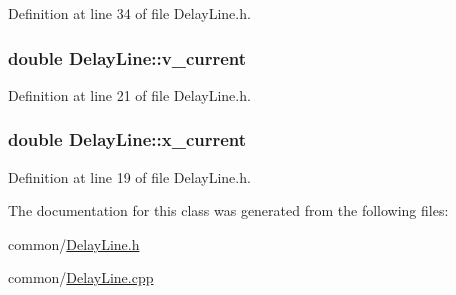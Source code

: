 Definition at line 34 of file DelayLine.h.

\hypertarget{classDelayLine_a4d51575ded15097f1a837d3ceeaf6bec}{
\subsubsection[{v\_\-current}]{\setlength{\rightskip}{0pt plus 5cm}double {\bf DelayLine::v\_\-current}}}
\label{classDelayLine_a4d51575ded15097f1a837d3ceeaf6bec}


Definition at line 21 of file DelayLine.h.

\hypertarget{classDelayLine_a36cd2a92c561630bbaa6646f23a00626}{
\subsubsection[{x\_\-current}]{\setlength{\rightskip}{0pt plus 5cm}double {\bf DelayLine::x\_\-current}}}
\label{classDelayLine_a36cd2a92c561630bbaa6646f23a00626}


Definition at line 19 of file DelayLine.h.



The documentation for this class was generated from the following files:\begin{DoxyCompactItemize}
\item 
common/\hyperlink{DelayLine_8h}{DelayLine.h}\item 
common/\hyperlink{DelayLine_8cpp}{DelayLine.cpp}\end{DoxyCompactItemize}
